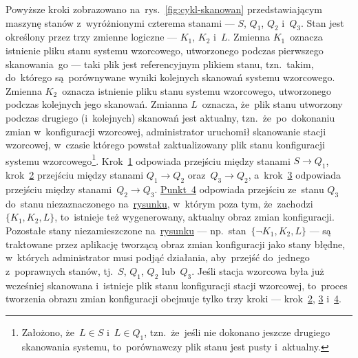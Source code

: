\documentclass[thesis]{subfiles}
\begin{document}
Powyższe kroki zobrazowano na~rys.~\ref{fig:cykl-skanowan} przedstawiającym maszynę stanów z~wyróżnionymi czterema stanami --- $S$, $Q_1$, $Q_2$ i~$Q_3$. Stan jest określony przez trzy zmienne logiczne --- $K_1$, $K_2$ i~$L$. Zmienna $K_1$~oznacza istnienie pliku stanu systemu wzorcowego, utworzonego podczas pierwszego skanowania~go --- taki plik jest referencyjnym plikiem stanu, tzn.~takim, do~którego są~porównywane wyniki kolejnych skanowań systemu wzorcowego. Zmienna $K_2$~oznacza istnienie pliku stanu systemu wzorcowego, utworzonego podczas kolejnych jego skanowań. Zmianna $L$~oznacza, że~plik stanu utworzony podczas drugiego (i~kolejnych) skanowań jest aktualny, tzn.~że~po~dokonaniu zmian w~konfiguracji wzorcowej, administrator uruchomił skanowanie stacji wzorcowej, w~czasie którego powstał zaktualizowany plik stanu konfiguracji systemu wzorcowego\footnote{Założono, że~$L\in S$ i~$L\in Q_1$, tzn.~że~jeśli nie dokonano jeszcze drugiego skanowania systemu, to~porównawczy plik stanu jest pusty i~aktualny.}. Krok~\hyperlink{itm:pierwsze-skanowanie}{1} odpowiada przejściu między stanami $S\rightarrow Q_1$, krok~\hyperlink{itm:dokonanie-zmian}{2} przejściu między stanami $Q_1\rightarrow Q_2$ oraz~$Q_3\rightarrow Q_2$, a~krok~\hyperlink{itm:drugie-skanowanie}{3} odpowiada przejściu między stanami~$Q_2\rightarrow Q_3$. \hyperlink{itm:stworzenie-obrazu-konfiguracji}{Punkt~4} odpowiada przejściu ze~stanu $Q_3$ do~stanu niezaznaczonego na~\hyperref[fig:cykl-skanowan]{rysunku}, w~którym poza tym, że~zachodzi $\{K_1, K_2, L\}$, to~istnieje też wygenerowany, aktualny obraz zmian konfiguracji. Pozostałe stany niezamieszczone na~\hyperref[fig:cykl-skanowan]{rysunku} --- np.~stan~$\{\neg K_1,K_2,L\}$ --- są traktowane przez aplikację tworzącą obraz zmian konfiguracji jako stany błędne, w~których administrator musi podjąć działania, aby~przejść do~jednego z~poprawnych stanów, tj.~$S$, $Q_1$, $Q_2$ lub~$Q_3$. Jeśli stacja wzorcowa była już wcześniej skanowana i~istnieje plik stanu konfiguracji stacji wzorcowej, to~proces tworzenia obrazu zmian konfiguracji obejmuje tylko trzy kroki --- krok~\hyperlink{itm:dokonanie-zmian}{2}, \hyperlink{itm:drugie-skanowanie}{3} i~\hyperlink{itm:stworzenie-obrazu-konfiguracji}{4}.
\end{document}
